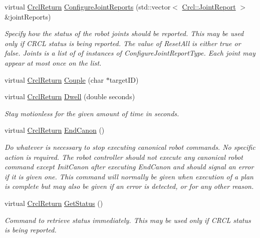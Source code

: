 \begin{DoxyCompactItemize}
virtual \hyperlink{namespaceCrcl_a1ed3b29723118a020251dde9b12733c0}{Crcl\-Return} \hyperlink{classCrcl_1_1CrclDelegateInterface_a41d9d47da2cb9463fe258903c7c8ed62}{Configure\-Joint\-Reports} (std\-::vector$<$ \hyperlink{structCrcl_1_1JointReport}{Crcl\-::\-Joint\-Report} $>$ \&joint\-Reports)
\begin{DoxyCompactList}\small\item\em Specify how the status of the robot joints should be reported. This may be used only if C\-R\-C\-L status is being reported. The value of Reset\-All is either true or false. Joints is a list of of instances of Configure\-Joint\-Report\-Type. Each joint may appear at most once on the list. \end{DoxyCompactList}\item 
virtual \hyperlink{namespaceCrcl_a1ed3b29723118a020251dde9b12733c0}{Crcl\-Return} \hyperlink{classCrcl_1_1CrclDelegateInterface_a5c4272b12bfcbd390d3c9baa3a858e73}{Couple} (char $\ast$target\-I\-D)
\item 
virtual \hyperlink{namespaceCrcl_a1ed3b29723118a020251dde9b12733c0}{Crcl\-Return} \hyperlink{classCrcl_1_1CrclDelegateInterface_a0202e19f87f1609889820ce3dc7e2aa3}{Dwell} (double seconds)
\begin{DoxyCompactList}\small\item\em Stay motionless for the given amount of time in seconds. \end{DoxyCompactList}\item 
virtual \hyperlink{namespaceCrcl_a1ed3b29723118a020251dde9b12733c0}{Crcl\-Return} \hyperlink{classCrcl_1_1CrclDelegateInterface_a401c506a2e16f1498fb28a638f0a816a}{End\-Canon} ()
\begin{DoxyCompactList}\small\item\em Do whatever is necessary to stop executing canonical robot commands. No specific action is required. The robot controller should not execute any canonical robot command except Init\-Canon after executing End\-Canon and should signal an error if it is given one. This command will normally be given when execution of a plan is complete but may also be given if an error is detected, or for any other reason. \end{DoxyCompactList}\item 
virtual \hyperlink{namespaceCrcl_a1ed3b29723118a020251dde9b12733c0}{Crcl\-Return} \hyperlink{classCrcl_1_1CrclDelegateInterface_a695656a7cdcb0ec121fabeb8847e47f2}{Get\-Status} ()
\begin{DoxyCompactList}\small\item\em Command to retrieve status immediately. This may be used only if C\-R\-C\-L status is being reported. \end{DoxyCompactList}\item 

\end{DoxyCompactItemize}
